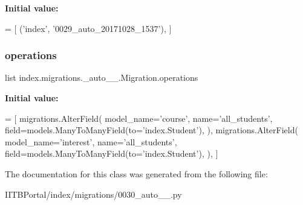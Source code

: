 {\bfseries Initial value\+:}
\begin{DoxyCode}
=  [
        (\textcolor{stringliteral}{'index'}, \textcolor{stringliteral}{'0029\_auto\_20171028\_1537'}),
    ]
\end{DoxyCode}
\mbox{\label{classindex_1_1migrations_1_10030__auto__20171028__1712_1_1Migration_a26d20f4cb7f6a37e64f84dabde6c1963}} 
\subsubsection{\texorpdfstring{operations}{operations}}
{\footnotesize\ttfamily list index.\+migrations.\+\_\+auto\+\_\+\_.\+Migration.\+operations\hspace{0.3cm}{\ttfamily [static]}}

{\bfseries Initial value\+:}
\begin{DoxyCode}
=  [
        migrations.AlterField(
            model\_name=\textcolor{stringliteral}{'course'},
            name=\textcolor{stringliteral}{'all\_students'},
            field=models.ManyToManyField(to=\textcolor{stringliteral}{'index.Student'}),
        ),
        migrations.AlterField(
            model\_name=\textcolor{stringliteral}{'interest'},
            name=\textcolor{stringliteral}{'all\_students'},
            field=models.ManyToManyField(to=\textcolor{stringliteral}{'index.Student'}),
        ),
    ]
\end{DoxyCode}


The documentation for this class was generated from the following file\+:\begin{DoxyCompactItemize}
\item 
I\+I\+T\+B\+Portal/index/migrations/0030\+\_\+auto\+\_\+\_.\+py\end{DoxyCompactItemize}
